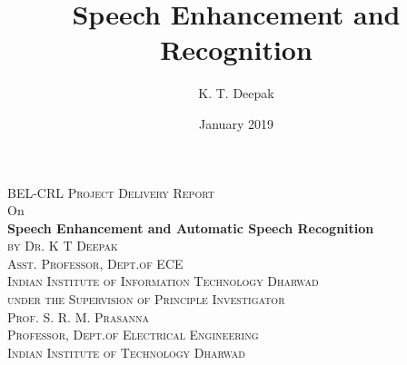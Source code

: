 \documentclass[12pt]{article}
\title{Speech Enhancement and Recognition}
\author{K. T. Deepak }
\date{January 2019}										%
\begin{document}

\begin{titlepage}
	\centering
    \vspace*{0.5 cm}
	\textsc{\Large BEL-CRL Project Delivery Report}\\[0.5 cm]				%
    \centering
    \textsf{\Large On}\\[0.5 cm]	
    \centering
    \textbf{\Large Speech Enhancement and Automatic Speech Recognition}\\[0.5 cm]
    \centering
    \textsc{\large by Dr. K T Deepak}\\[0.5 cm]
    \textsc{\large Asst. Professor, Dept.of ECE}\\[0.5 cm]
        \textsc{\large Indian Institute of Information Technology Dharwad}\\[0.5 cm]
    \textsc{\small under the Supervision of Principle Investigator}\\[0.5 cm]
    \textsc{\large Prof. S. R. M. Prasanna}\\[0.5 cm]
    \textsc{\large Professor, Dept.of Electrical Engineering}\\[0.5 cm]
        \textsc{\large Indian Institute of Technology Dharwad}            
        
    	
\end{titlepage}

\newpage
\listoffigures
\end{document}
